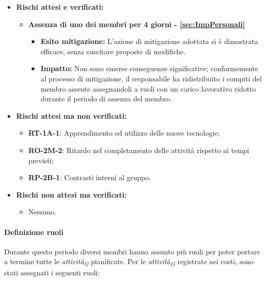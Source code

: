 \begin{itemize}
    \item \textbf{Rischi attesi e verificati:}
\begin{itemize}
    \item \textbf{Assenza di uno dei membri per 4 giorni - \ref{sec:ImpPersonali}}
    \begin{itemize}
        \item \textbf{Esito mitigazione:} 
        L'azione di mitigazione adottata si è dimostrata efficace, senza suscitare proposte di modifiche.
        \item \textbf{Impatto:}
        Non sono emerse conseguenze significative; conformemente al processo di mitigazione, il responsabile ha ridistribuito i compiti del membro assente assegnandoli a ruoli con un carico lavorativo ridotto durante il periodo di assenza del membro.
    \end{itemize}
\end{itemize}
\item \textbf{Rischi attesi ma non verificati:}
 \begin{itemize}
    \item \textbf{RT-1A-1}: Apprendimento ed utilizzo delle nuove tecnologie;
    \item \textbf{RO-2M-2}: Ritardo nel completamento delle attività rispetto ai tempi previsti;
    \item \textbf{RP-2B-1}: Contrasti interni al gruppo.
\end{itemize}
\item \textbf{Rischi non attesi ma verificati:}
\begin{itemize}
    \item Nessuno.
\end{itemize}
\end{itemize}


\paragraph{Definizione ruoli}
Durante questo periodo diversi membri hanno assunto più ruoli per poter portare a termine tutte le \textit{attività}\textsubscript{\textit{G}} pianificate.
Per le \textit{attività}\textsubscript{\textit{G}} registrate nei costi, sono stati assegnati i seguenti ruoli:

